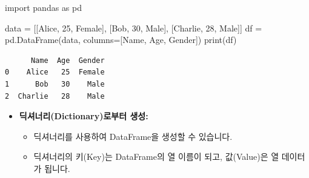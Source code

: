 \documentclass[
  letterpaper,
]{book}
\newenvironment{Shaded}{\begin{snugshade}}{\end{snugshade}}
\newcommand{\BuiltInTok}[1]{\textcolor[rgb]{0.00,0.23,0.31}{#1}}
\newcommand{\DecValTok}[1]{\textcolor[rgb]{0.68,0.00,0.00}{#1}}
\newcommand{\ImportTok}[1]{\textcolor[rgb]{0.00,0.46,0.62}{#1}}
\newcommand{\NormalTok}[1]{\textcolor[rgb]{0.00,0.23,0.31}{#1}}
\newcommand{\OperatorTok}[1]{\textcolor[rgb]{0.37,0.37,0.37}{#1}}
\newcommand{\StringTok}[1]{\textcolor[rgb]{0.13,0.47,0.30}{#1}}
\providecommand{\tightlist}{%
  \setlength{\itemsep}{0pt}\setlength{\parskip}{0pt}}
\begin{document}
\begin{Shaded}
\begin{Highlighting}[]
    \ImportTok{import}\NormalTok{ pandas }\ImportTok{as}\NormalTok{ pd}

\NormalTok{    data }\OperatorTok{=}\NormalTok{ [[}\StringTok{\textquotesingle{}Alice\textquotesingle{}}\NormalTok{, }\DecValTok{25}\NormalTok{, }\StringTok{\textquotesingle{}Female\textquotesingle{}}\NormalTok{], [}\StringTok{\textquotesingle{}Bob\textquotesingle{}}\NormalTok{, }\DecValTok{30}\NormalTok{, }\StringTok{\textquotesingle{}Male\textquotesingle{}}\NormalTok{], [}\StringTok{\textquotesingle{}Charlie\textquotesingle{}}\NormalTok{, }\DecValTok{28}\NormalTok{, }\StringTok{\textquotesingle{}Male\textquotesingle{}}\NormalTok{]]}
\NormalTok{    df }\OperatorTok{=}\NormalTok{ pd.DataFrame(data, columns}\OperatorTok{=}\NormalTok{[}\StringTok{\textquotesingle{}Name\textquotesingle{}}\NormalTok{, }\StringTok{\textquotesingle{}Age\textquotesingle{}}\NormalTok{, }\StringTok{\textquotesingle{}Gender\textquotesingle{}}\NormalTok{])}
    \BuiltInTok{print}\NormalTok{(df)}
\end{Highlighting}
\end{Shaded}

\begin{verbatim}
      Name  Age  Gender
0    Alice   25  Female
1      Bob   30    Male
2  Charlie   28    Male
\end{verbatim}

\begin{itemize}
\item
  \textbf{딕셔너리(Dictionary)로부터 생성:}

  \begin{itemize}
  \tightlist
  \item
    딕셔너리를 사용하여 DataFrame을 생성할 수 있습니다.
  \item
    딕셔너리의 키(Key)는 DataFrame의 열 이름이 되고, 값(Value)은 열
    데이터가 됩니다.
  \end{itemize}
\end{itemize}
\end{document}
